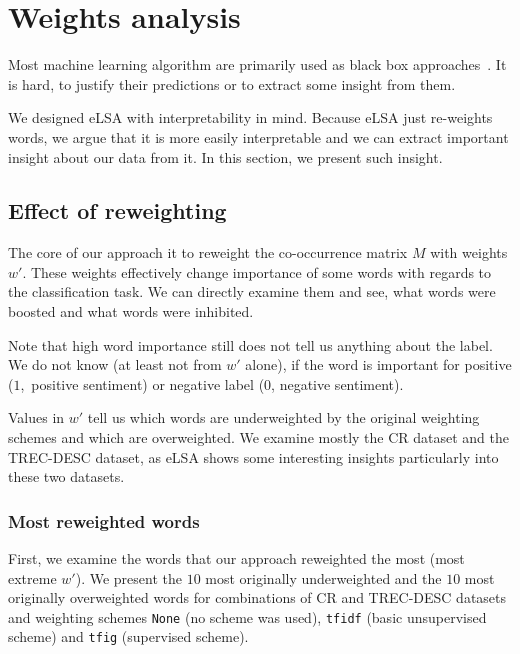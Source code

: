 \section{Weights analysis} \label{chap:weight:analysis}

    Most machine learning algorithm are primarily used as black box approaches~\cite{ribeiro2016should}. %
    It is hard, to justify their predictions or to extract some insight from them. 
    
    We designed eLSA with interpretability in mind.
    Because eLSA just re-weights words, we argue that it is more easily interpretable and we can extract important insight about our data from it.
    In this section, we present such insight.
    
    \subsection{Effect of reweighting}
    The core of our approach it to reweight the co-occurrence matrix $M$ with weights $w'$. 
    These weights effectively change importance of some words with regards to the classification task.
    We can directly examine them and see, what words were boosted and what words were inhibited.
    
    Note that high word importance still does not tell us anything about the label. 
    We do not know (at least not from $w'$ alone), if the word is important for positive ($1$,~positive sentiment) or negative label ($0$, negative sentiment).
    
    Values in $w'$ tell us which words are underweighted by the original weighting schemes and which are overweighted.
    We examine mostly the CR dataset and the TREC-DESC dataset, as eLSA shows some interesting insights particularly into these two datasets.

    \subsubsection{Most reweighted words}
    
    First, we examine the words that our approach reweighted the most (most extreme $w'$).
    We present the $10$ most originally underweighted and the $10$ most originally overweighted words for combinations of CR and TREC-DESC datasets and weighting schemes \texttt{None} (no scheme was used), \texttt{tfidf} (basic unsupervised scheme) and \texttt{tfig} (supervised scheme).
    

